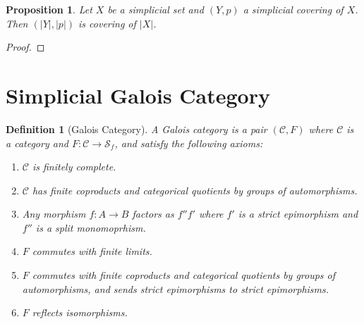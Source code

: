 \documentclass{amsart}
\newtheorem{proposition}{Proposition}[section]
\newtheorem{definition}{Definition}[section]
\begin{document}
\begin{proposition}
Let $X$ be a simplicial set and  $(Y,p)$ a simplicial covering of $X$. Then $(\vert Y\vert,\vert p\vert)$ is covering of $\vert X\vert$.
\end{proposition}

\begin{proof}

\end{proof}

\section{Simplicial Galois Category}

\begin{definition}[Galois Category]
A Galois category is a pair $(\mathcal{C},F)$ where $\mathcal{C}$ is a category and $F\colon \mathcal{C}\longrightarrow \mathcal{S}_f$, and satisfy the following axioms:
\begin{enumerate}[{GC}1)]
\item $\mathcal{C}$ is finitely complete.
\item $\mathcal{C}$ has finite coproducts and categorical quotients by groups of automorphisms.
\item Any morphism $f\colon A\longrightarrow B$ factors as $f''f'$ where $f'$ is a strict epimorphism and $f''$ is a split monomoprhism.
\item $F$ commutes with finite limits.
\item $F$ commutes with finite coproducts and categorical quotients by groups of automorphisms, and sends strict epimorphisms to strict epimorphisms.
\item $F$ reflects isomorphisms.
\end{enumerate}
\end{definition}




\end{document}
